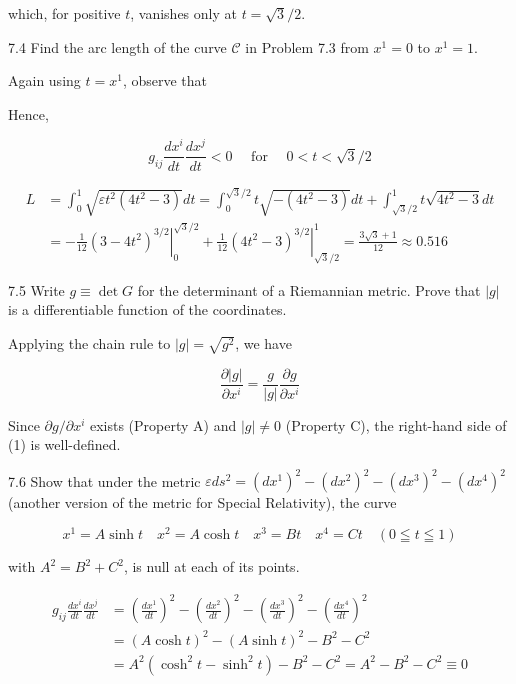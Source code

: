 \documentclass[10pt]{article}
\begin{document}
which, for positive $t$, vanishes only at $t=\sqrt{3} / 2$.

7.4 Find the arc length of the curve $\mathscr{C}$ in Problem 7.3 from $x^{1}=0$ to $x^{1}=1$.

Again using $t=x^{1}$, observe that

Hence,

$$
g_{i j} \frac{d x^{i}}{d t} \frac{d x^{j}}{d t}<0 \quad \text { for } \quad 0<t<\sqrt{3} / 2
$$

$$
\begin{aligned}
L & =\int_{0}^{1} \sqrt{\varepsilon t^{2}\left(4 t^{2}-3\right)} d t=\int_{0}^{\sqrt{3} / 2} t \sqrt{-\left(4 t^{2}-3\right)} d t+\int_{\sqrt{3} / 2}^{1} t \sqrt{4 t^{2}-3} d t \\
& =-\left.\frac{1}{12}\left(3-4 t^{2}\right)^{3 / 2}\right|_{0} ^{\sqrt{3} / 2}+\left.\frac{1}{12}\left(4 t^{2}-3\right)^{3 / 2}\right|_{\sqrt{3} / 2} ^{1}=\frac{3 \sqrt{3}+1}{12} \approx 0.516
\end{aligned}
$$

7.5 Write $g \equiv \operatorname{det} G$ for the determinant of a Riemannian metric. Prove that $|g|$ is a differentiable function of the coordinates.

Applying the chain rule to $|g|=\sqrt{g^{2}}$, we have


\begin{equation*}
\frac{\partial|g|}{\partial x^{i}}=\frac{g}{|g|} \frac{\partial g}{\partial x^{i}} \tag{1}
\end{equation*}


Since $\partial g / \partial x^{i}$ exists (Property A) and $|g| \neq 0$ (Property C), the right-hand side of (1) is well-defined.

7.6 Show that under the metric $\varepsilon d s^{2}=\left(d x^{1}\right)^{2}-\left(d x^{2}\right)^{2}-\left(d x^{3}\right)^{2}-\left(d x^{4}\right)^{2}$ (another version of the metric for Special Relativity), the curve

$$
x^{1}=A \sinh t \quad x^{2}=A \cosh t \quad x^{3}=B t \quad x^{4}=C t \quad(0 \leqq t \leqq 1)
$$

with $A^{2}=B^{2}+C^{2}$, is null at each of its points.

$$
\begin{aligned}
g_{i j} \frac{d x^{i}}{d t} \frac{d x^{j}}{d t} & =\left(\frac{d x^{1}}{d t}\right)^{2}-\left(\frac{d x^{2}}{d t}\right)^{2}-\left(\frac{d x^{3}}{d t}\right)^{2}-\left(\frac{d x^{4}}{d t}\right)^{2} \\
& =(A \cosh t)^{2}-(A \sinh t)^{2}-B^{2}-C^{2} \\
& =A^{2}\left(\cosh ^{2} t-\sinh ^{2} t\right)-B^{2}-C^{2}=A^{2}-B^{2}-C^{2} \equiv 0
\end{aligned}
$$
\end{document}
